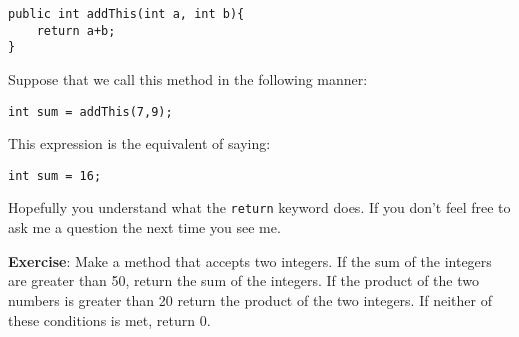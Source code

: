 \documentclass[11pt,fleqn]{article}
\begin{document}
\begin{verbatim}
public int addThis(int a, int b){
    return a+b;
}
\end{verbatim}  

Suppose that we call this method in the following manner:

\begin{verbatim}
int sum = addThis(7,9);
\end{verbatim} 
 
This expression is the equivalent of saying:

\begin{verbatim}
int sum = 16;
\end{verbatim}

Hopefully you understand what the \texttt{return} keyword does. If you don't
feel free to ask me a question the next time you see me. 

\textbf{Exercise}: Make a method that accepts two integers. If the sum of the
integers are greater than 50, return the sum of the integers. If the product of
the two numbers is greater than 20 return the product of the two integers. If
neither of these conditions is met, return 0.
\end{document}
